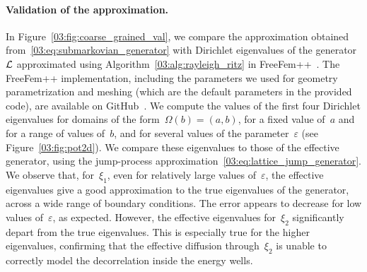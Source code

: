 \paragraph{Validation of the approximation.}
In Figure~\ref{03:fig:coarse_grained_val}, we compare the approximation obtained from~\eqref{03:eq:submarkovian_generator} with Dirichlet eigenvalues of the generator~$\mathcal{L}$ approximated using Algorithm~\ref{03:alg:rayleigh_ritz} in FreeFem++~\cite{freefem}.
The FreeFem++ implementation, including the parameters we used for geometry parametrization and meshing (which are the default parameters in the provided code), are available on GitHub~\cite{github}.
We compute the values of the first four Dirichlet eigenvalues for domains of the form~$\Omega(b)=\left(a,b\right)$, for a fixed value of~$a$ and for a range of values of~$b$, and for several values of the parameter~$\varepsilon$ (see Figure~\ref{03:fig:pot2d}).
We compare these eigenvalues to those of the effective generator, using the jump-process approximation~\eqref{03:eq:lattice_jump_generator}. We observe that, for~$\xi_1$, even for relatively large values of~$\varepsilon$, the effective eigenvalues give a good approximation to the true eigenvalues of the generator, across a wide range of boundary conditions.
The error appears to decrease for low values of~$\varepsilon$, as expected. However, the effective eigenvalues for~$\xi_2$ significantly depart from the true eigenvalues. This is especially true for the higher eigenvalues, confirming that the effective diffusion through~$\xi_2$ is unable to correctly model the decorrelation inside the energy wells.

